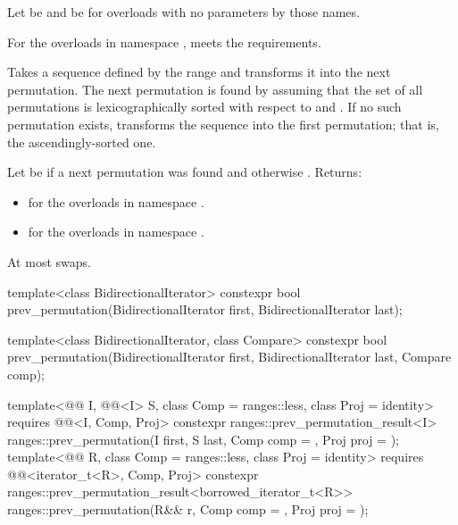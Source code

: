 \begin{itemdescr}
\pnum
Let  be 
and  be 
for overloads with no parameters by those names.

\pnum
\expects
For the overloads in namespace ,
 meets
the  requirements.

\pnum
\effects
Takes a sequence defined by the range 
and transforms it into the next permutation.
The next permutation is found by assuming that the set of all permutations
is lexicographically sorted with respect to  and .
If no such permutation exists,
transforms the sequence into the first permutation;
that is, the ascendingly-sorted one.

\pnum
\returns
Let  be  if a next permutation was found and
otherwise .
Returns:
\begin{itemize}
\item {} for the overloads in namespace .
\item {} for the overloads in namespace .
\end{itemize}

\pnum
\complexity
At most  swaps.
\end{itemdescr}

%
\begin{itemdecl}
template<class BidirectionalIterator>
  constexpr bool prev_permutation(BidirectionalIterator first,
                                  BidirectionalIterator last);

template<class BidirectionalIterator, class Compare>
  constexpr bool prev_permutation(BidirectionalIterator first,
                                  BidirectionalIterator last, Compare comp);

template<@@ I, @@<I> S, class Comp = ranges::less,
         class Proj = identity>
  requires @@<I, Comp, Proj>
  constexpr ranges::prev_permutation_result<I>
    ranges::prev_permutation(I first, S last, Comp comp = {}, Proj proj = {});
template<@@ R, class Comp = ranges::less,
         class Proj = identity>
  requires @@<iterator_t<R>, Comp, Proj>
  constexpr ranges::prev_permutation_result<borrowed_iterator_t<R>>
    ranges::prev_permutation(R&& r, Comp comp = {}, Proj proj = {});
\end{itemdecl}

